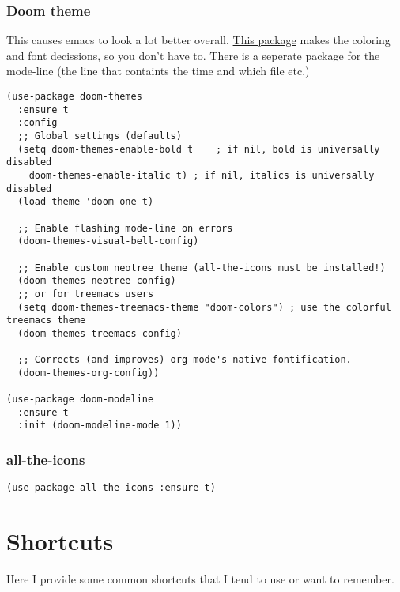 \documentclass[11pt]{article}
\begin{document}
\subsubsection{Doom theme}
\label{sec:orgd0db29c}
This causes emacs to look a lot better overall. \href{https://github.com/hlissner/emacs-doom-themes}{This package} makes the coloring and font decissions, so you don't have to. There is a seperate package for the mode-line (the line that containts the time and which file etc.)
\begin{verbatim}
(use-package doom-themes
  :ensure t
  :config
  ;; Global settings (defaults)
  (setq doom-themes-enable-bold t    ; if nil, bold is universally disabled
	doom-themes-enable-italic t) ; if nil, italics is universally disabled
  (load-theme 'doom-one t)

  ;; Enable flashing mode-line on errors
  (doom-themes-visual-bell-config)

  ;; Enable custom neotree theme (all-the-icons must be installed!)
  (doom-themes-neotree-config)
  ;; or for treemacs users
  (setq doom-themes-treemacs-theme "doom-colors") ; use the colorful treemacs theme
  (doom-themes-treemacs-config)

  ;; Corrects (and improves) org-mode's native fontification.
  (doom-themes-org-config))

(use-package doom-modeline
  :ensure t
  :init (doom-modeline-mode 1))
\end{verbatim}
\subsubsection{all-the-icons}
\label{sec:orge9760f5}
\begin{verbatim}
(use-package all-the-icons :ensure t)
\end{verbatim}
\section{Shortcuts}
\label{sec:org67a41db}
Here I provide some common shortcuts that I tend to use or want to remember. 
\end{document}
